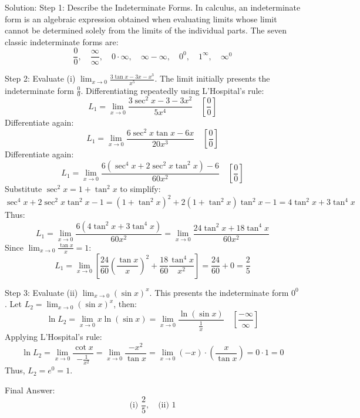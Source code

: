 \documentclass{article}
\begin{document}
Solution:
Step 1: Describe the Indeterminate Forms.
In calculus, an indeterminate form is an algebraic expression obtained when evaluating limits whose limit cannot be determined solely from the limits of the individual parts. The seven classic indeterminate forms are:
\[
\frac{0}{0}, \quad \frac{\infty}{\infty}, \quad 0 \cdot \infty, \quad \infty - \infty, \quad 0^0, \quad 1^\infty, \quad \infty^0
\]

Step 2: Evaluate (i) $\lim_{x \to 0} \frac{3 \tan x - 3x - x^3}{x^5}$.
The limit initially presents the indeterminate form $\frac{0}{0}$. Differentiating repeatedly using L'Hospital's rule:
\[
L_1 = \lim_{x \to 0} \frac{3\sec^2 x - 3 - 3x^2}{5x^4} \quad \left[\frac{0}{0}\right]
\]
Differentiate again:
\[
L_1 = \lim_{x \to 0} \frac{6\sec^2 x \tan x - 6x}{20x^3} \quad \left[\frac{0}{0}\right]
\]
Differentiate again:
\[
L_1 = \lim_{x \to 0} \frac{6\left(\sec^4 x + 2\sec^2 x \tan^2 x\right) - 6}{60x^2} \quad \left[\frac{0}{0}\right]
\]
Substitute $\sec^2 x = 1 + \tan^2 x$ to simplify:
\[
\sec^4 x + 2\sec^2 x \tan^2 x - 1 = (1 + \tan^2 x)^2 + 2(1 + \tan^2 x)\tan^2 x - 1 = 4\tan^2 x + 3\tan^4 x
\]
Thus:
\[
L_1 = \lim_{x \to 0} \frac{6\left(4\tan^2 x + 3\tan^4 x\right)}{60x^2} = \lim_{x \to 0} \frac{24\tan^2 x + 18\tan^4 x}{60x^2}
\]
Since $\lim_{x \to 0} \frac{\tan x}{x} = 1$:
\[
L_1 = \lim_{x \to 0} \left[ \frac{24}{60} \left(\frac{\tan x}{x}\right)^2 + \frac{18}{60} \frac{\tan^4 x}{x^2} \right] = \frac{24}{60} + 0 = \frac{2}{5}
\]

Step 3: Evaluate (ii) $\lim_{x \to 0} (\sin x)^x$.
This presents the indeterminate form $0^0$. Let $L_2 = \lim_{x \to 0} (\sin x)^x$, then:
\[
\ln L_2 = \lim_{x \to 0} x \ln(\sin x) = \lim_{x \to 0} \frac{\ln(\sin x)}{\frac{1}{x}} \quad \left[\frac{-\infty}{\infty}\right]
\]
Applying L'Hospital's rule:
\[
\ln L_2 = \lim_{x \to 0} \frac{\cot x}{-\frac{1}{x^2}} = \lim_{x \to 0} \frac{-x^2}{\tan x} = \lim_{x \to 0} (-x) \cdot \left(\frac{x}{\tan x}\right) = 0 \cdot 1 = 0
\]
Thus, $L_2 = e^0 = 1$.

Final Answer:
\[
\boxed{\text{(i) } \frac{2}{5}, \quad \text{(ii) } 1}
\]

\end{document}
